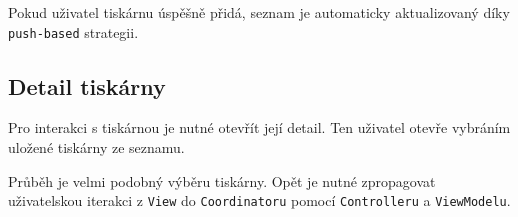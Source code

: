 Pokud uživatel tiskárnu úspěšně přidá, seznam je automaticky aktualizovaný díky \texttt{push-based} strategii.


\subsection{Detail tiskárny}

Pro interakci s tiskárnou je nutné otevřít její detail.
Ten uživatel otevře vybráním uložené tiskárny ze seznamu.

Průběh je velmi podobný výběru tiskárny.
Opět je nutné zpropagovat uživatelskou iterakci z \texttt{View} do \texttt{Coordinatoru} pomocí \texttt{Controlleru} a \texttt{ViewModelu}.